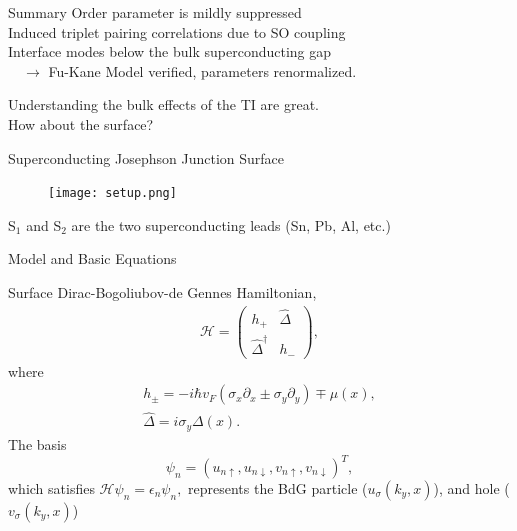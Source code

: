\documentclass[]{beamer}
\begin{document}
\begin{frame}{Summary}
\Large
Order parameter is mildly suppressed\\
Induced triplet pairing correlations due to SO coupling\\
Interface modes below the bulk superconducting gap\\
$\quad \rightarrow$ Fu-Kane Model verified, parameters renormalized.\\
\end{frame} 




 \begin{frame}{}
\Large 
Understanding the bulk effects of the TI are great.\\
How about the surface?
\end{frame}







 \begin{frame}{Superconducting Josephson Junction Surface}

\begin{figure}
\center
\texttt{[image: setup.png]}
\label{setup}
\end{figure}
S$_1$ and S$_2$ are the two superconducting leads (Sn, Pb, Al, etc.)
\end{frame} 
 \begin{frame}{Model and Basic Equations}

Surface Dirac-Bogoliubov-de Gennes Hamiltonian,
\begin{eqnarray}
&\mathcal{H}=\left(
\begin{array}{cc}
h_{+}  &  \hat{\Delta} \\
\hat{\Delta}^\dagger  &   h_{-}
\end{array}\label{fkmodel}
\right),&
\end{eqnarray}
where
\begin{eqnarray}
&h_{\pm}= -i\hbar  v_F (\sigma_x\partial_x \pm \sigma_y \partial_y) \mp \mu(x),&\\
&\hat{\Delta}= i\sigma_y  \Delta(x).&
\end{eqnarray}
The basis
\begin{equation}
\psi_n=\left ( { u} _{n\uparrow},  { u}_{n\downarrow},  { v}_{n\uparrow}, { v}_{n\downarrow} \right )^T,
\end{equation} 
which satisfies $ \mathcal{H}\psi_n=\epsilon_n \psi_n, $ represents the BdG particle ($u_\sigma (k_y, x)$), and hole ($v_\sigma (k_y, x)$) 

\end{frame} 
\end{document}
